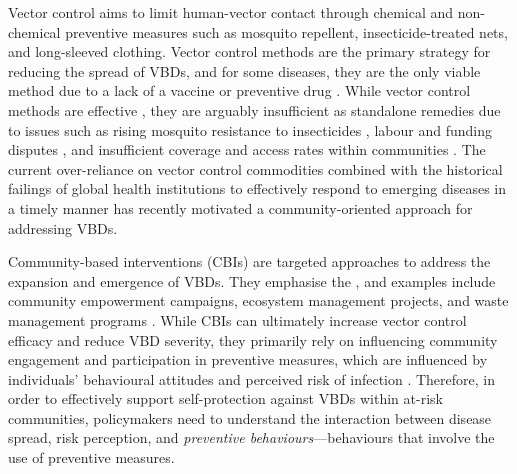 Vector control aims to limit human-vector contact through chemical and non-chemical preventive measures such as mosquito repellent, insecticide-treated nets, and long-sleeved clothing. Vector control methods are the primary strategy for reducing the spread of VBDs, and for some diseases, they are the only viable method due to a lack of a vaccine or preventive drug \cite{wilson_importance_2020}. While vector control methods are effective \cite{wilson_importance_2020, chala_emerging_2021}, they are arguably insufficient as standalone remedies due to issues such as rising mosquito resistance to insecticides \cite{hemingway_averting_2016}, labour and funding disputes \cite{winch_effectiveness_1992}, and insufficient coverage and access rates within communities \cite{okumu_what_2022}. The current over-reliance on vector control commodities combined with the historical failings of global health institutions to effectively respond to emerging diseases in a timely manner \cite{bardosh_addressing_2017} has recently motivated a community-oriented approach for addressing VBDs.

Community-based interventions (CBIs) are targeted approaches to address the expansion and emergence of VBDs. They emphasise the  \cite{bardosh_addressing_2017}, and examples include community empowerment campaigns, ecosystem management projects, and waste management programs \cite{perez_realist_2021}. While CBIs can ultimately increase vector control efficacy and reduce VBD severity, they primarily rely on influencing community engagement and participation in preventive measures, which are influenced by individuals' behavioural attitudes and perceived risk of infection \cite{winch_effectiveness_1992, brewer_risk_2004, raude_public_2012, lopes-rafegas_contribution_2023}. Therefore, in order to effectively support self-protection against VBDs within at-risk communities, policymakers need to understand the interaction between disease spread, risk perception, and \textit{preventive behaviours}---behaviours that involve the use of preventive measures.

